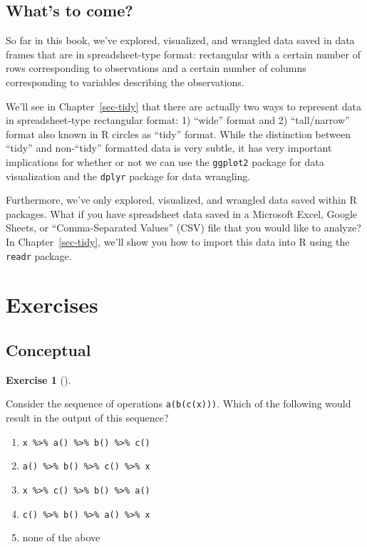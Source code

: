 \documentclass[
  letterpaper,
  DIV=11,
  numbers=noendperiod]{scrreprt}
\providecommand{\tightlist}{%
  \setlength{\itemsep}{0pt}\setlength{\parskip}{0pt}}\usepackage{longtable,booktabs,array}
\theoremstyle{definition}
\newtheorem{exercise}{Exercise}[chapter]
\theoremstyle{remark}
\begin{document}
\hypertarget{whats-to-come}{%
\subsection{What's to come?}\label{whats-to-come}}

So far in this book, we've explored, visualized, and wrangled data saved
in data frames that are in spreadsheet-type format: rectangular with a
certain number of rows corresponding to observations and a certain
number of columns corresponding to variables describing the
observations.

We'll see in Chapter~\ref{sec-tidy} that there are actually two ways to
represent data in spreadsheet-type rectangular format: 1) ``wide''
format and 2) ``tall/narrow'' format also known in R circles as ``tidy''
format. While the distinction between ``tidy'' and non-``tidy''
formatted data is very subtle, it has very important implications for
whether or not we can use the \texttt{ggplot2} package for data
visualization and the \texttt{dplyr} package for data wrangling.

Furthermore, we've only explored, visualized, and wrangled data saved
within R packages. What if you have spreadsheet data saved in a
Microsoft Excel, Google Sheets, or ``Comma-Separated Values'' (CSV) file
that you would like to analyze? In Chapter~\ref{sec-tidy}, we'll show
you how to import this data into R using the \texttt{readr} package.

\hypertarget{sec-ex03}{%
\section{Exercises}\label{sec-ex03}}

\hypertarget{sec-ex03-conceptual}{%
\subsection{Conceptual}\label{sec-ex03-conceptual}}

\leavevmode{}%
\begin{exercise}[]\label{exr-ch03-c01}

Consider the sequence of operations \texttt{a(b(c(x)))}. Which of the
following would result in the output of this sequence?

\begin{enumerate}
\def\labelenumi{\alph{enumi})}
\tightlist
\item
  \texttt{x\ \%\textgreater{}\%\ a()\ \%\textgreater{}\%\ b()\ \%\textgreater{}\%\ c()}
\item
  \texttt{a()\ \%\textgreater{}\%\ b()\ \%\textgreater{}\%\ c()\ \%\textgreater{}\%\ x}
\item
  \texttt{x\ \%\textgreater{}\%\ c()\ \%\textgreater{}\%\ b()\ \%\textgreater{}\%\ a()}
\item
  \texttt{c()\ \%\textgreater{}\%\ b()\ \%\textgreater{}\%\ a()\ \%\textgreater{}\%\ x}
\item
  none of the above
\end{enumerate}

\end{exercise}
\end{document}
